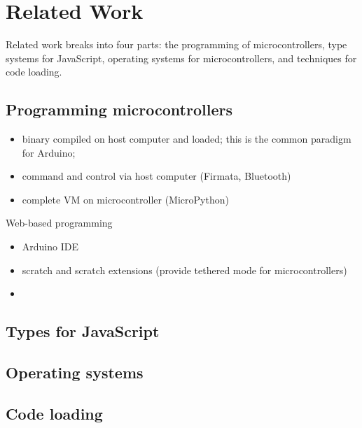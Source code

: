 \section{Related Work}
\label{sec:related}

Related work breaks into four parts: the programming of microcontrollers, 
type systems for JavaScript, operating systems
for microcontrollers, and techniques for code loading.

\subsection{Programming microcontrollers}

\begin{itemize}
\item binary compiled on host computer and loaded; this is the common paradigm for Arduino;
\item command and control via host computer (Firmata, Bluetooth)
\item complete VM on microcontroller (MicroPython)
\end{itemize}

Web-based programming

\begin{itemize}
\item Arduino IDE
\item scratch and scratch extensions (provide tethered mode for microcontrollers)
\item 
\end{itemize}

\subsection{Types for JavaScript }


\subsection{Operating systems}



\subsection{Code loading}

